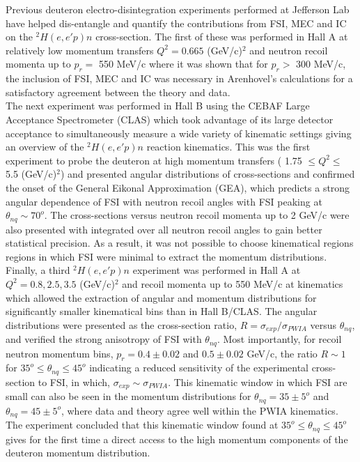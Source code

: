 \documentclass[aps,prl,twocolumn,showpacs,superscriptaddress,groupedaddress]{revtex4-1}  %
\begin{document}
\indent Previous deuteron electro-disintegration experiments performed at Jefferson Lab have helped dis-entangle and quantify the contributions from FSI, MEC and IC on the $^{2}H(e,e'p)n$ cross-section. 
The first of these was performed in Hall A at relatively low momentum transfers $Q^{2}=0.665$ (GeV/c)$^{2}$ and neutron recoil momenta up to $p_{r} = $ 550 MeV/c where it was shown that for
$p_{r}>$ 300 MeV/c, the inclusion of FSI, MEC and IC was necessary in Arenhovel's calculations for a satisfactory agreement between the theory and data. \\
\indent The next experiment was performed in Hall B using the CEBAF Large Acceptance Spectrometer (CLAS) which took advantage of its large detector acceptance to simultaneously measure
a wide variety of kinematic settings giving an overview of the $^{2}H(e,e'p)n$ reaction kinematics. This was the first experiment to probe the deuteron at high momentum transfers ( 1.75 $\leq Q^{2}\leq$ 5.5 (GeV/c)$^{2}$)
and presented angular distributions of cross-sections and confirmed the onset of the General Eikonal Approximation (GEA), which predicts a strong angular dependence of FSI with neutron recoil angles with FSI peaking at $\theta_{nq} \sim 70^{o}$.
The cross-sections versus neutron recoil momenta up to 2 GeV/c were also presented with integrated over all neutron recoil angles to gain better statistical precision. As a result, it was not possible to choose kinematical regions
regions in which FSI were minimal to extract the momentum distributions. \\
\indent Finally, a third $^{2}H(e,e'p)n$ experiment was performed in Hall A at $Q^{2} = 0.8, 2.5, 3.5$ (GeV/c)$^{2}$ and recoil momenta up to 550 MeV/c at kinematics which allowed the extraction of angular and momentum distributions for significantly
smaller kinematical bins than in Hall B/CLAS. The angular distributions were presented as the cross-section ratio, $R = \sigma_{exp}/\sigma_{PWIA}$ versus $\theta_{nq}$, and verified the strong anisotropy of FSI with $\theta_{nq}$.
Most importantly, for recoil neutron momentum bins, $p_{r}=0.4\pm0.02$ and $0.5\pm0.02$ GeV/c, the ratio $R\sim1$ for $35^{o}\leq \theta_{nq}\leq45^{o}$ indicating a reduced sensitivity of the experimental cross-section to FSI,
in which, $\sigma_{exp}\sim\sigma_{PWIA}$.  This kinematic window in which FSI are small can also be seen in the momentum distributions for $\theta_{nq}=35\pm5^{o}$ and $\theta_{nq}=45\pm5^{o}$, where data and theory agree well
within the PWIA kinematics. The experiment concluded that this kinematic window found at $35^{o}\leq \theta_{nq}\leq45^{o}$ gives for the first time a direct access to the high momentum components of the deuteron momentum distribution.









\end{document}
